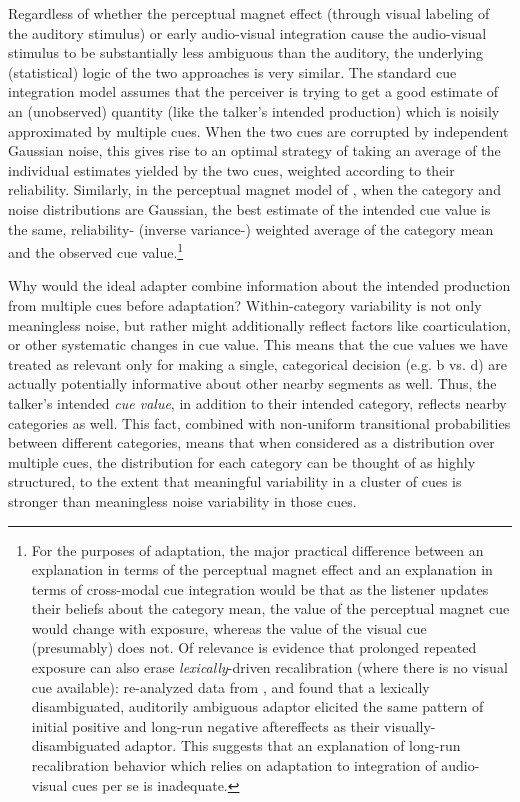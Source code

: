 Regardless of whether the perceptual magnet effect (through visual labeling of the auditory stimulus) or early audio-visual integration cause the audio-visual stimulus to be substantially less ambiguous than the auditory, the underlying (statistical) logic of the two approaches is very similar.  The standard cue integration model \autocite{Ernst2002} assumes that the perceiver is trying to get a good estimate of an (unobserved) quantity (like the talker's intended production) which is noisily approximated by multiple cues.  When the two cues are corrupted by independent Gaussian noise, this gives rise to an optimal strategy of taking an average of the individual estimates yielded by the two cues, weighted according to their reliability.  Similarly, in the perceptual magnet model of \textcite{Feldman2009a}, when the category and noise distributions are Gaussian, the best estimate of the intended cue value is the same, reliability- (inverse variance-) weighted average of the category mean and the observed cue value.\footnote{For the purposes of adaptation, the major practical difference between an explanation in terms of the perceptual magnet effect and an explanation in terms of cross-modal cue integration would be that as the listener updates their beliefs about the category mean, the value of the perceptual magnet cue would change with exposure, whereas the value of the visual cue (presumably) does not.
Of relevance is evidence that prolonged repeated exposure can also erase \emph{lexically}-driven recalibration (where there is no visual cue available): \textcite{Vroomen2007} re-analyzed data from \textcite{Samuel2001}, and found that a lexically disambiguated, auditorily ambiguous adaptor  elicited the same pattern of initial positive and long-run negative aftereffects as their visually-disambiguated adaptor. This suggests that an explanation of long-run recalibration behavior which relies on adaptation to integration of audio-visual cues per se is inadequate.}

Why would the ideal adapter combine information about the intended production from multiple cues before adaptation?  Within-category variability is not only meaningless noise, but rather might additionally reflect factors like coarticulation, or other systematic changes in cue value.  This means that the cue values we have treated as relevant only for making a single, categorical decision (e.g. \ph b vs. \ph d) are actually potentially informative about other nearby segments as well.  Thus, the talker's intended \emph{cue value}, in addition to their intended category, reflects nearby categories as well.  This fact, combined with non-uniform transitional probabilities between different categories, means that when considered as a distribution over multiple cues, the distribution for each category can be thought of as highly structured, to the extent that meaningful variability in a cluster of cues is stronger than meaningless noise variability in those cues.

